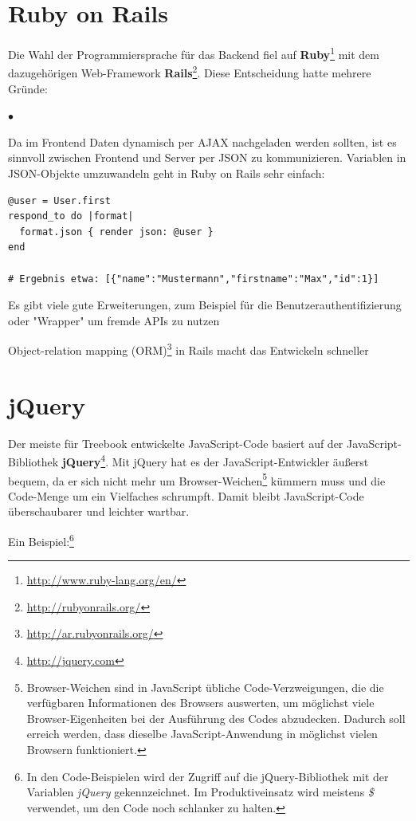 \documentclass[10pt,a4paper]{book}
\begin{document}
\section{Ruby on Rails}
Die Wahl der Programmiersprache für das Backend fiel auf \textbf{Ruby}\footnote{\href{http://www.ruby-lang.org/en/}{http://www.ruby-lang.org/en/}} mit dem dazugehörigen Web-Framework \textbf{Rails}\footnote{\href{http://rubyonrails.org/}{http://rubyonrails.org/}}. Diese Entscheidung hatte mehrere Gründe:
\lstset{language=bash}
\begin{list}{$\bullet$}{}
\item Da im Frontend Daten dynamisch per AJAX nachgeladen werden sollten, ist es sinnvoll zwischen Frontend und Server per JSON zu kommunizieren. Variablen in JSON-Objekte umzuwandeln geht in Ruby on Rails sehr einfach:
\begin{lstlisting}
@user = User.first
respond_to do |format|
  format.json { render json: @user }
end

# Ergebnis etwa: [{"name":"Mustermann","firstname":"Max","id":1}]
\end{lstlisting}
\item Es gibt viele gute Erweiterungen, zum Beispiel für die Benutzerauthentifizierung oder "Wrapper" um fremde APIs zu nutzen
\item Object-relation mapping (ORM)\footnote{\href{http://ar.rubyonrails.org/}{http://ar.rubyonrails.org/}} in Rails macht das Entwickeln schneller
\end{list}

\section{jQuery}
Der meiste für Treebook entwickelte JavaScript-Code basiert auf der JavaScript-Bibliothek \textbf{jQuery}\footnote{\href{http://jquery.com}{http://jquery.com}}. Mit jQuery hat es der JavaScript-Entwickler äußerst bequem, da er sich nicht mehr um Browser-Weichen\footnote{Browser-Weichen sind in JavaScript übliche Code-Verzweigungen, die die verfügbaren Informationen des Browsers auswerten, um möglichst viele Browser-Eigenheiten bei der Ausführung des Codes abzudecken. Dadurch soll erreich werden, dass dieselbe JavaScript-Anwendung in möglichst vielen Browsern funktioniert.} kümmern muss und die Code-Menge um ein Vielfaches schrumpft. Damit bleibt JavaScript-Code überschaubarer und leichter wartbar.

Ein Beispiel:\footnote{In den Code-Beispielen wird der Zugriff auf die jQuery-Bibliothek mit der Variablen \textit{jQuery} gekennzeichnet. Im Produktiveinsatz wird meistens \textit{\$} verwendet, um den Code noch schlanker zu halten.}
\end{document}
